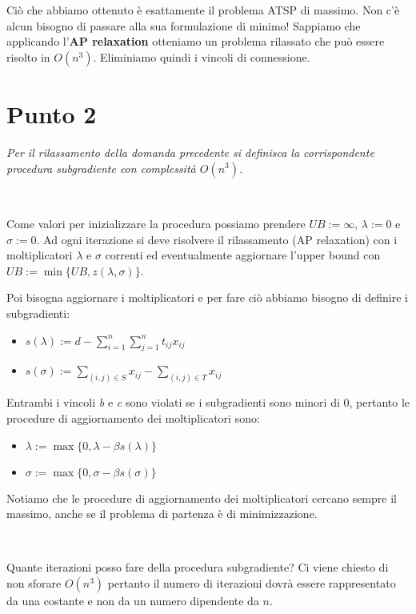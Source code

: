 \documentclass[11pt]{book}
\begin{document}
Ci\`o che abbiamo ottenuto \`e esattamente il problema ATSP di
massimo. Non c'\`e alcun bisogno di passare alla sua formulazione di
minimo! Sappiamo che applicando l'\textbf{AP relaxation} otteniamo un
problema rilassato che pu\`o essere risolto in $O(n^3)$. Eliminiamo
quindi i vincoli di connessione.

\section*{Punto 2}

\textit{Per il rilassamento della domanda precedente si definisca la
  corrispondente procedura subgradiente con complessit\`a $O(n^3)$.}

\

Come valori per inizializzare la procedura possiamo prendere $UB:=\infty$,
$\lambda:=0$ e $\sigma :=0$. Ad ogni iterazione si deve risolvere il
rilassamento (AP relaxation) con i moltiplicatori $\lambda$ e $\sigma$
correnti ed eventualmente aggiornare l'upper bound con $UB := \min
\{UB, z(\lambda, \sigma) \}$.

Poi bisogna aggiornare i moltiplicatori e per fare ci\`o abbiamo
bisogno di definire i subgradienti:

\begin{itemize}
\item $s(\lambda) := d - \sum\limits_{i=1}^n\sum\limits_{j=1}^n
  t_{ij}x_{ij}$
\item $s(\sigma) := \sum\limits_{(i,j)\in S}x_{ij} -
  \sum\limits_{(i,j) \in T}x_{ij}$
\end{itemize}

Entrambi i vincoli \textit{b} e \textit{c} sono violati se i
subgradienti sono minori di 0, pertanto le procedure di aggiornamento
dei moltiplicatori sono:

\begin{itemize}
\item $\lambda := \max \{ 0, \lambda - \beta s(\lambda)\}$
\item $\sigma := \max \{0, \sigma - \beta s(\sigma)\}$
\end{itemize}

Notiamo che le procedure di aggiornamento dei moltiplicatori cercano
sempre il massimo, anche se il problema di partenza \`e di
minimizzazione.

\

Quante iterazioni posso fare della procedura subgradiente? Ci viene
chiesto di non sforare $O(n^3)$ pertanto il numero di iterazioni
dovr\`a essere rappresentato da una costante e non da un numero
dipendente da $n$.
\end{document}
